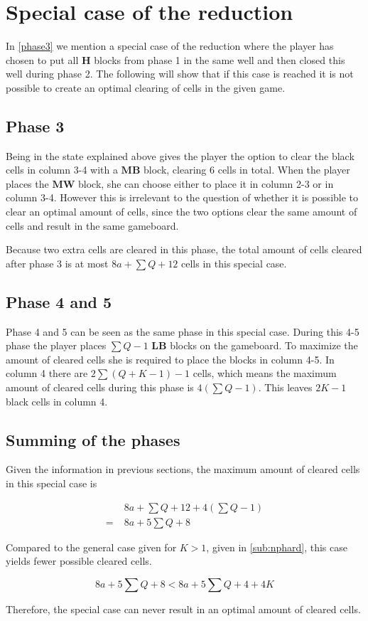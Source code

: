 \section{Special case of the reduction}
\label{specialcasereduction}

In \ref{phase3} we mention a special case of the reduction where the player has chosen to put all $\mathbf{H}$ blocks from phase 1 in the same well and then closed this well during phase 2. The following will show that if this case is reached it is not possible to create an optimal clearing of cells in the given game.

\subsection*{Phase 3}
Being in the state explained above gives the player the option to clear the black cells in column 3-4 with a $\mathbf{MB}$ block, clearing 6 cells in total. When the player places the $\mathbf{MW}$ block, she can choose either to place it in column 2-3 or in column 3-4. However this is irrelevant to the question of whether it is possible to clear an optimal amount of cells, since the two options clear the same amount of cells and result in the same gameboard.

Because two extra cells are cleared in this phase, the total amount of cells cleared after phase 3 is at most $8a + \sum Q + 12$ cells in this special case.

\subsection*{Phase 4 and 5}

Phase 4 and 5 can be seen as the same phase in this special case. During this 4-5 phase the player places $\sum Q - 1$ $\mathbf{LB}$ blocks on the gameboard. To maximize the amount of cleared cells she is required to place the blocks in column 4-5. In column 4 there are $2 \sum \left( Q + K - 1 \right) - 1$ cells, which means the maximum amount of cleared cells during this phase is $ 4 \left( \sum Q - 1 \right)$. This leaves $2K-1$ black cells in column 4.

\subsection*{Summing of the phases}

Given the information in previous sections, the maximum amount of cleared cells in this special case is

\begin{align*}
  & 8a + \sum Q + 12 + 4 \left( \sum Q - 1 \right) \\
= \; & 8a + 5 \sum Q + 8
\end{align*}

Compared to the general case given for $K > 1$, given in \ref{sub:nphard}, this case yields fewer possible cleared cells.

\begin{equation*}
8a + 5 \sum Q + 8 < 8a + 5 \sum Q + 4 + 4K
\end{equation*}

Therefore, the special case can never result in an optimal amount of cleared cells.
